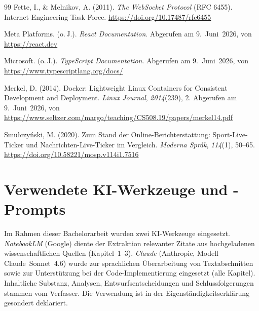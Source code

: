 \begin{thebibliography}{99}
  Fette, I., \& Melnikov, A. (2011). \textit{The WebSocket Protocol} (RFC 6455). Internet Engineering Task Force. \url{https://doi.org/10.17487/rfc6455}

  Meta Platforms. (o.\,J.). \textit{React Documentation}. Abgerufen am 9.~Juni~2026, von \url{https://react.dev}

  Microsoft. (o.\,J.). \textit{TypeScript Documentation}. Abgerufen am 9.~Juni~2026, von \url{https://www.typescriptlang.org/docs/}

  Merkel, D. (2014). Docker: Lightweight Linux Containers for Consistent Development and Deployment. \textit{Linux Journal}, \textit{2014}(239), 2. Abgerufen am 9.~Juni~2026, von \url{https://www.seltzer.com/margo/teaching/CS508.19/papers/merkel14.pdf}

  Smułczyński, M. (2020). Zum Stand der Online-Berichterstattung: Sport-Live-Ticker und Nachrichten-Live-Ticker im Vergleich. \textit{Moderna Språk}, \textit{114}(1), 50--65. \url{https://doi.org/10.58221/mosp.v114i1.7516}

\end{thebibliography}

\newpage
\section*{Verwendete KI-Werkzeuge und -Prompts}

Im Rahmen dieser Bachelorarbeit wurden zwei KI-Werkzeuge eingesetzt. \textit{NotebookLM} (Google) diente der Extraktion relevanter Zitate aus hochgeladenen wissenschaftlichen Quellen (Kapitel~1--3). \textit{Claude} (Anthropic, Modell Claude~Sonnet~4.6) wurde zur sprachlichen Überarbeitung von Textabschnitten sowie zur Unterstützung bei der Code-Implementierung eingesetzt (alle Kapitel). Inhaltliche Substanz, Analysen, Entwurfsentscheidungen und Schlussfolgerungen stammen vom Verfasser. Die Verwendung ist in der Eigenständigkeitserklärung gesondert deklariert.

